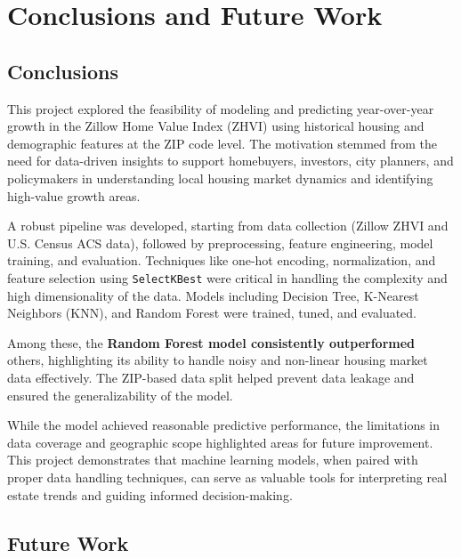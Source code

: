 \chapter{Conclusions and Future Work}
\label{ch:con}

\section{Conclusions}

This project explored the feasibility of modeling and predicting year-over-year growth in the Zillow Home Value Index (ZHVI) using historical housing and demographic features at the ZIP code level. The motivation stemmed from the need for data-driven insights to support homebuyers, investors, city planners, and policymakers in understanding local housing market dynamics and identifying high-value growth areas.

A robust pipeline was developed, starting from data collection (Zillow ZHVI and U.S. Census ACS data), followed by preprocessing, feature engineering, model training, and evaluation. Techniques like one-hot encoding, normalization, and feature selection using \texttt{SelectKBest} were critical in handling the complexity and high dimensionality of the data. Models including Decision Tree, K-Nearest Neighbors (KNN), and Random Forest were trained, tuned, and evaluated.

Among these, the \textbf{Random Forest model consistently outperformed} others, highlighting its ability to handle noisy and non-linear housing market data effectively. The ZIP-based data split helped prevent data leakage and ensured the generalizability of the model.

While the model achieved reasonable predictive performance, the limitations in data coverage and geographic scope highlighted areas for future improvement. This project demonstrates that machine learning models, when paired with proper data handling techniques, can serve as valuable tools for interpreting real estate trends and guiding informed decision-making.

\section{Future Work}


